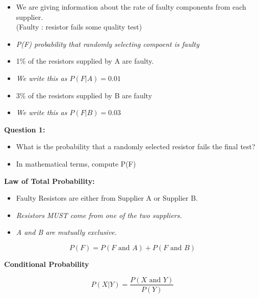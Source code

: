 \documentclass[12pt]{report}
\begin{document}
		\Large
		\begin{itemize}
			\item We are giving information about the rate of faulty components from each supplier. \\(Faulty : resistor fails some quality test)
			\item  \textit{P(F) probability that randomly selecting compoent is faulty}
			\item 1\% of the resistors supplied by A are faulty.
			\item\textit{ We write this as $P(F|A) =0.01$}
			\item 3\% of the resistors supplied by B are faulty 
			\item \textit{We write this as $P(F|B) =0.03$}
		\end{itemize}
		
		\Large
		\vspace{-1.5cm}
		\textbf{Question 1:}
		\begin{itemize}
			\item What is the probability that a randomly selected resistor fails the final test?
			
			\item In mathematical terms, compute P(F) 
		\end{itemize}
		
		
		
		
		
		\Large
		\textbf{Law of Total Probability:}
		\begin{itemize}
			\item Faulty Resistors are either from Supplier A or Supplier B.
			\vspace{0.3cm} 
			\item \textit{Resistors MUST come from one of the two suppliers.}
			\item \textit{A and B are mutually exclusive.}
		\end{itemize}
		\vspace{0.3cm} 
		\[ P(F) = P(F \mbox{ and } A) + P(F \mbox{ and } B) \]
		
		
		
		
		\Large
		\textbf{Conditional Probability}
		
		\[ P(X|Y)  = \frac{P(X \mbox{ and } Y)}{P(Y)} \]
		
\end{document}
